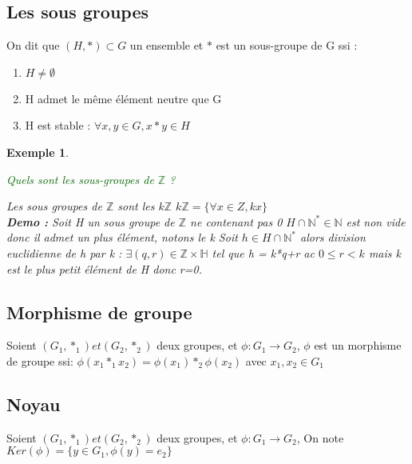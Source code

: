 \documentclass[12pt]{report}
\theoremstyle{break}%
\newtheorem{monex}{Exemple}[chapter]
\begin{document}
\subsection{Les sous groupes}
\begin{madef}
	On dit que $(H, \ast) \subset G$ un ensemble et $\ast$ est un sous-groupe de G ssi :
	\begin{enumerate}
		\item $H \neq \emptyset$
		\item H admet le m\^eme \'el\'ement neutre que G
		\item H est stable : $\forall x, y \in G, x*y \in H$ 
	\end{enumerate}
\end{madef}
\begin{monex}
	\begin{bf}
	\textcolor{darkgreen}{Quels sont les sous-groupes de $\mathbb{Z}$ ?}
	\end{bf}
	\newline
	Les sous groupes de $\mathbb{Z}$ sont les $k\mathbb{Z}$
	\newline
	$k\mathbb{Z} = \{\forall x \in Z, kx\}$ 
	\newline
	\\
	\textbf {Demo :}
	Soit H un sous groupe de $\mathbb{Z}$ ne contenant pas 0
	\newline
	$H \cap \mathbb{N^*} \in \mathbb{N}$ est non vide donc il admet un plus \'el\'ement, notons le k \newline
	Soit $h \in H \cap \mathbb{N^*}$ alors division euclidienne de h par k : $\exists (q,r) \in \mathbb{Z} \times \mathbb{H}$ tel que h = k*q+r ac $0 \le r < k$ mais k est le plus petit \'el\'ement de H donc r=0. 
\end{monex}

\subsection{Morphisme de groupe}
\begin{madef}
	Soient $(G_1, \ast_1) et (G_2, \ast_2)$ deux groupes, et
	$\phi : G_1 \longrightarrow G_2$, 
	\newline 
	$\phi$ est un morphisme de groupe ssi:
	$\phi(x_1*_1x_2) = \phi(x_1) *_2 \phi(x_2)$ avec $x_1, x_2 \in G_1$
\end{madef}

\subsection{Noyau}
\begin{madef}
	Soient $(G_1, \ast_1) et (G_2, \ast_2)$ deux groupes, et
	$\phi : G_1 \longrightarrow G_2$, 
	\newline
	On note $Ker(\phi) = \{y\in G_1, \phi(y)=e_2\} $
\end{madef}
\end{document}
